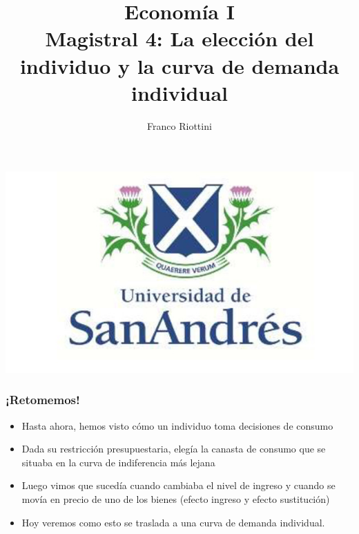 \documentclass{beamer}
\title[Economía I]{Economía I \vspace{4mm}
\\ Magistral 4: La elección del individuo y la curva de demanda individual}
\date{}
\author[Riottini]{Franco Riottini}
\institute[]{Universidad de San Andrés}
\begin{document}
\begin{frame}
\titlepage
\centering
\includegraphics[scale=0.2]{../Figures/logoUDESA.jpg} 
\end{frame}

\begin{frame}
\frametitle{¡Retomemos!}
\begin{itemize}
  \item Hasta ahora, hemos visto cómo un individuo toma decisiones de consumo
  \item Dada su restricción presupuestaria, elegía la canasta de consumo que se situaba en la curva de indiferencia más lejana
  \item Luego vimos que sucedía cuando cambiaba el nivel de ingreso y cuando se movía en precio de uno de los bienes (efecto ingreso y efecto sustitución) 
  \item Hoy veremos como esto se traslada a una curva de demanda individual.
\end{itemize}
\end{frame}
\end{document}
